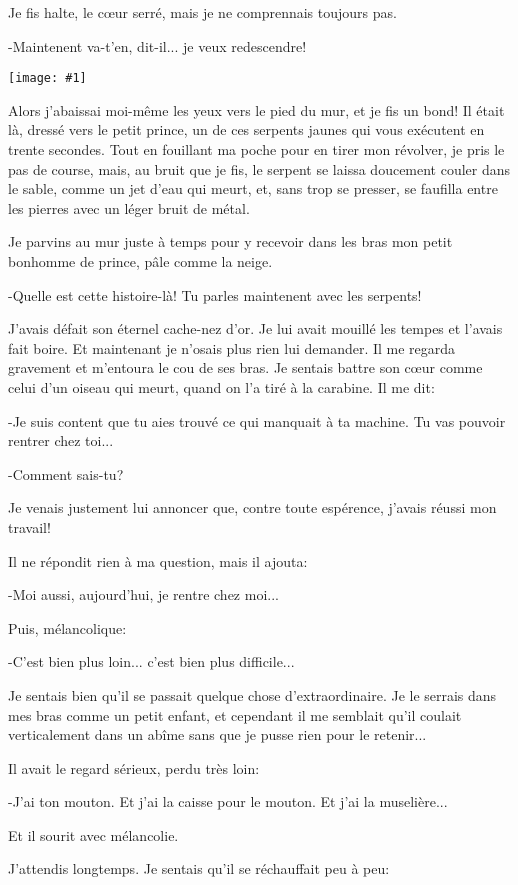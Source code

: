 \documentclass{report}
\newcommand{\incpic}[1]{%
\begin{center}
    \texttt{[image: \#1]}
\end{center}%
}
\begin{document}
Je fis halte, le cœur serré, mais je ne comprennais toujours pas.

-Maintenent va-t'en, dit-il... je veux redescendre! 

\incpic{pic/image42.jpeg}

Alors j'abaissai moi-même les yeux vers le pied du mur, et je fis un bond! Il était là, dressé vers le petit prince, un de ces serpents jaunes qui vous exécutent en trente secondes. Tout en fouillant ma poche pour en tirer mon révolver, je pris le pas de course, mais, au bruit que je fis, le serpent se laissa doucement couler dans le sable, comme un jet d'eau qui meurt, et, sans trop se presser, se faufilla entre les pierres avec un léger bruit de métal.

Je parvins au mur juste à temps pour y recevoir dans les bras mon petit bonhomme de prince, pâle comme la neige.

-Quelle est cette histoire-là! Tu parles maintenent avec les serpents!

J'avais défait son éternel cache-nez d'or. Je lui avait mouillé les tempes et l'avais fait boire. Et maintenant je n'osais plus rien lui demander. Il me regarda gravement et m'entoura le cou de ses bras. Je sentais battre son cœur comme celui d'un oiseau qui meurt, quand on l'a tiré à la carabine. Il me dit:

-Je suis content que tu aies trouvé ce qui manquait à ta machine. Tu vas pouvoir rentrer chez toi...

-Comment sais-tu?

Je venais justement lui annoncer que, contre toute espérence, j'avais réussi mon travail!

Il ne répondit rien à ma question, mais il ajouta:

-Moi aussi, aujourd'hui, je rentre chez moi...

Puis, mélancolique:

-C'est bien plus loin... c'est bien plus difficile...

Je sentais bien qu'il se passait quelque chose d'extraordinaire. Je le serrais dans mes bras comme un petit enfant, et cependant il me semblait qu'il coulait verticalement dans un abîme sans que je pusse rien pour le retenir...

Il avait le regard sérieux, perdu très loin:

-J'ai ton mouton. Et j'ai la caisse pour le mouton. Et j'ai la muselière...

Et il sourit avec mélancolie.

J'attendis longtemps. Je sentais qu'il se réchauffait peu à peu:
\end{document}
